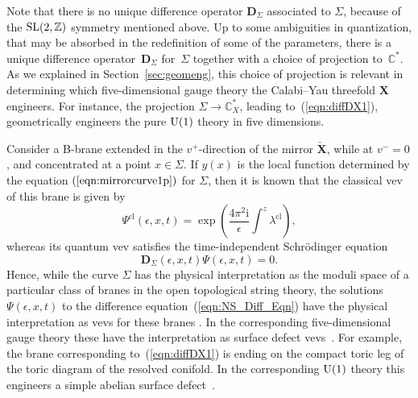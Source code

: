 \documentclass[pdftex]{sigma}
\numberwithin{equation}{section}
\begin{document}
Note that there is no unique difference operator $\mathbf{D}_{\Sigma}$ associated to $\Sigma$, because of the ${\rm SL}(2,\mathbb{Z})$ symmetry mentioned above. Up to some ambiguities in quantization, that may be absorbed in the redefinition of some of the parameters, there is a unique difference operator~$\mathbf{D}_{\Sigma}$ for~$\Sigma$ together with a choice of projection to~$\mathbb{C}^*$. As we explained in Section~\ref{sec:geomeng}, this choice of projection is relevant in determining which five-dimensional gauge theory the Calabi--Yau threefold $\mathbf{X}$ engineers. For instance, the projection $\Sigma \to \mathbb{C}^*_{X}$, leading to~(\ref{eqn:diffDX1}), geometrically engineers the pure ${\rm U}(1)$ theory in five dimensions.

Consider a B-brane extended in the $v^+$-direction of the mirror $\check{\mathbf{X}}$, while at $v^-=0$, and concentrated at a point $x \in \Sigma$. If $y(x)$ is the local function determined by the equation $(\ref{eqn:mirrorcurve1p})$ for $\Sigma$, then it is known that the classical vev of this brane is given by~\cite{Aganagic:2000gs}
\begin{equation*}%
 \Psi^{\text{cl}} (\epsilon,x,t) = \exp \left( \frac{4 \pi^2 \mathrm{i} }{\epsilon}\int^z \lambda^{\text{cl}} \right),
\end{equation*}
whereas its quantum vev satisfies the time-independent Schr\"odinger equation \cite{ADKMV}
\begin{equation}\label{eqn:NS_Diff_Eqn}
 \mathbf{D}_\Sigma(\epsilon,x,t) \Psi(\epsilon,x,t) = 0.
\end{equation}
Hence, while the curve $\Sigma$ has the physical interpretation as the moduli space of a particular class of branes in the open topological string theory, the solutions $\Psi(\epsilon,x,t)$ to the difference equation~(\ref{eqn:NS_Diff_Eqn})
have the physical interpretation as vevs for these branes \cite{ACDKV, NS}. In the corresponding five-dimensional gauge theory these have the interpretation as surface defect vevs~\cite{Dimofte:2010tz}. For example, the brane corresponding to~(\ref{eqn:diffDX1}) is ending on the compact toric leg of the toric diagram of the resolved conifold. In the corresponding ${\rm U}(1)$ theory this engineers a simple abelian surface defect~\cite{Dimofte:2010tz}.
\end{document}
